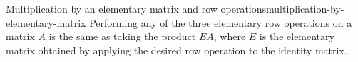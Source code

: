 \begin{theorem}{Multiplication by an elementary matrix and row operations}{multiplication-by-elementary-matrix}
  Performing any of the three elementary row operations on a matrix $A$ is the
  same as taking the product $EA$, where $E$ is the elementary matrix
  obtained by applying the desired row operation to the identity
  matrix.
\end{theorem}

